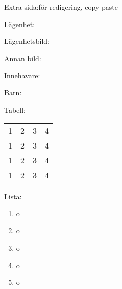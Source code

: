 
Extra sida:för redigering, copy-paste

Lägenhet:
\jhhouse{}{}{}{}{}

Lägenhetsbild:

Annan bild:

Innehavare:

Barn:
\begin{jhchildren}
  \item {}
  \item {}
  \item {}
  \item {}
\end{jhchildren}

Tabell:
\begin{center}
  \begin{tabular}{l l l r}
    \hline
    1 & 2 & 3 & 4 \\
    1 & 2 & 3 & 4 \\
    1 & 2 & 3 & 4 \\
    1 & 2 & 3 & 4 \\
    \hline
  \end{tabular}
\end{center}

Lista:
\begin{enumerate}
  \item o
  \item o
  \item o
  \item o
  \item o
\end{enumerate}
